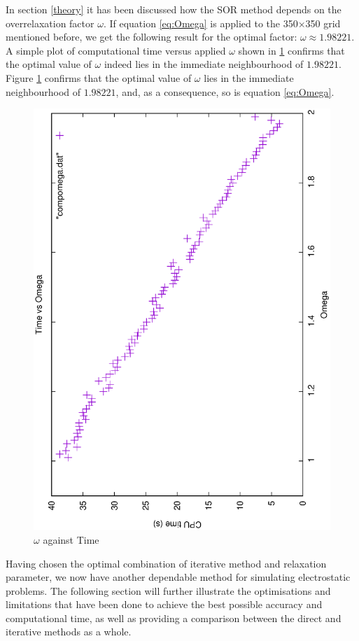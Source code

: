 \documentclass[a4paper]{article}
\begin{document}
In section \ref{theory} it has been discussed how the SOR method depends on the 
overrelaxation factor $\omega$. If equation \ref{eq:Omega} is applied to the 
350$\times$350 grid mentioned before, we get the following result for the optimal 
factor: $\omega \approx 1.98221$. A simple plot of computational time versus 
applied $\omega$ shown in \ref{fig:omega} confirms that the optimal value of 
$\omega$ indeed lies in the immediate neighbourhood of  $1.98221$.
Figure \ref{fig:omega} confirms that the optimal value of $\omega$ lies in the 
immediate neighbourhood of  $1.98221$, and, as a consequence, so is equation 
\ref{eq:Omega}. 
\begin{figure}[h!]
\centering
\includegraphics[scale=0.35,angle=-90]{compomega}
\caption{$\omega$ against Time}
\label{fig:omega}
\end{figure}
Having chosen the optimal combination of iterative method and relaxation 
parameter, we now have another dependable method for simulating electrostatic 
problems. The following section will further illustrate the optimisations and 
limitations that have been done to achieve the best possible accuracy and 
computational time, as well as providing a comparison between the direct and 
iterative methods as a whole.
\end{document}
